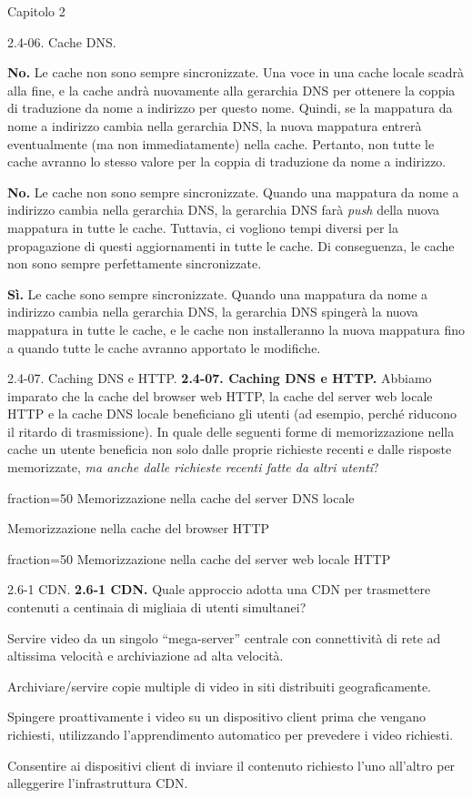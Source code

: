\documentclass[11pt]{article}
\begin{document}
\begin{quiz}{Capitolo 2}
\begin{multi}[points=1,shuffle]{2.4-06. Cache DNS.}
\item* \textbf{No.} Le cache non sono sempre sincronizzate. Una voce in una cache locale scadrà alla fine, e la cache andrà nuovamente alla gerarchia DNS per ottenere la coppia di traduzione da nome a indirizzo per questo nome. Quindi, se la mappatura da nome a indirizzo cambia nella gerarchia DNS, la nuova mappatura entrerà eventualmente (ma non immediatamente) nella cache. Pertanto, non tutte le cache avranno lo stesso valore per la coppia di traduzione da nome a indirizzo.
\item \textbf{No.} Le cache non sono sempre sincronizzate. Quando una mappatura da nome a indirizzo cambia nella gerarchia DNS, la gerarchia DNS farà \emph{push} della nuova mappatura in tutte le cache. Tuttavia, ci vogliono tempi diversi per la propagazione di questi aggiornamenti in tutte le cache. Di conseguenza, le cache non sono sempre perfettamente sincronizzate.
\item \textbf{Sì.} Le cache sono sempre sincronizzate. Quando una mappatura da nome a indirizzo cambia nella gerarchia DNS, la gerarchia DNS spingerà la nuova mappatura in tutte le cache, e le cache non installeranno la nuova mappatura fino a quando tutte le cache avranno apportato le modifiche.
\end{multi}

\begin{multi}[points=1,shuffle,multiple]{2.4-07. Caching DNS e HTTP.}
\textbf{2.4-07. Caching DNS e HTTP.}
Abbiamo imparato che la cache del browser web HTTP, la cache del server web locale HTTP e la cache DNS locale beneficiano gli utenti (ad esempio, perché riducono il ritardo di trasmissione). In quale delle seguenti forme di memorizzazione nella cache un utente beneficia non solo dalle proprie richieste recenti e dalle risposte memorizzate, \emph{ma anche dalle richieste recenti fatte da altri utenti}?
\item[fraction=50] Memorizzazione nella cache del server DNS locale
\item Memorizzazione nella cache del browser HTTP
\item[fraction=50] Memorizzazione nella cache del server web locale HTTP
\end{multi}


\begin{multi}[points=1,shuffle]{2.6-1 CDN.}
\textbf{2.6-1 CDN.}
Quale approccio adotta una CDN per trasmettere contenuti a centinaia di migliaia di utenti simultanei?
\item Servire video da un singolo ``mega-server'' centrale con connettività di rete ad altissima velocità e archiviazione ad alta velocità.
\item* Archiviare/servire copie multiple di video in siti distribuiti geograficamente.
\item Spingere proattivamente i video su un dispositivo client prima che vengano richiesti, utilizzando l'apprendimento automatico per prevedere i video richiesti.
\item Consentire ai dispositivi client di inviare il contenuto richiesto l'uno all'altro per alleggerire l'infrastruttura CDN.
\end{multi}



\end{quiz}
\end{document}
